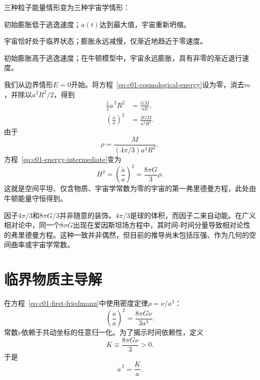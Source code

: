 三种粒子能量情形变为三种宇宙学情形：
\begin{description}[style=nextline]
\item[\(E<0\)：]初始膨胀低于逃逸速度；\(a(t)\)达到最大值，宇宙重新坍缩。
\item[\(E=0\)：]宇宙恰好处于临界状态；膨胀永远减慢，仅渐近地趋近于零速度。
\item[\(E>0\)：]初始膨胀高于逃逸速度；在牛顿模型中，宇宙永远膨胀，具有非零的渐近退行速度。
\end{description}

我们从边界情形\(E=0\)开始。将方程~\eqref{eq:c01-cosmological-energy}设为零，消去\(m\)，并除以\(a^2R^2/2\)，得到
\begin{align}
\frac12\dot a^{\,2}R^2&=\frac{GM}{aR}, \\
\left(\frac{\dot a}{a}\right)^2&=\frac{2GM}{a^3R^3}.
\label{eq:c01-energy-intermediate}
\end{align}
由于
\begin{equation}
\rho=\frac{M}{(4\pi/3)a^3R^3},
\end{equation}
方程~\eqref{eq:c01-energy-intermediate}变为
\begin{equation}
\boxed{
H^2=\left(\frac{\dot a}{a}\right)^2=\frac{8\pi G}{3}\rho.
}
\label{eq:c01-first-friedmann}
\end{equation}
这就是空间平坦、仅含物质、宇宙学常数为零的宇宙的第一弗里德曼方程，此处由牛顿能量守恒得到。

\begin{classroomqa}
\end{classroomqa}

因子\(4\pi/3\)和\(8\pi G/3\)并非随意的装饰。\(4\pi/3\)是球的体积，而因子二来自动能。在广义相对论中，同一个\(8\pi G\)出现在爱因斯坦场方程中，其时间-时间分量导致相对论性的弗里德曼方程。这种一致并非偶然，但目前的推导尚未包括压强、作为几何的空间曲率或宇宙学常数。

\section{临界物质主导解}

在方程~\eqref{eq:c01-first-friedmann}中使用密度定律\(\rho=\nu/a^3\)：
\begin{equation}
\left(\frac{\dot a}{a}\right)^2=\frac{8\pi G\nu}{3a^3}.
\label{eq:c01-matter-friedmann}
\end{equation}
常数\(\nu\)依赖于共动坐标的任意归一化。为了揭示时间依赖性，定义
\begin{equation}
K\equiv\frac{8\pi G\nu}{3}>0.
\end{equation}
于是
\begin{equation}
\dot a^{\,2}=\frac{K}{a}.
\label{eq:c01-normalized-friedmann}
\end{equation}

